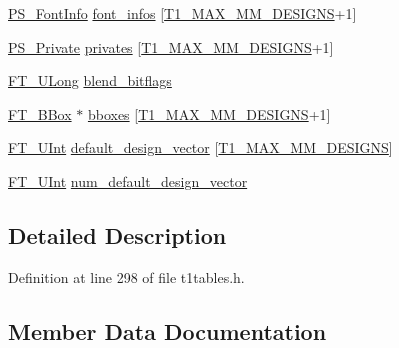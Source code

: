 \begin{DoxyCompactItemize}
\item 
\mbox{\hyperlink{t1tables_8h_a413d5f096543f289c85f416f688ffc06}{P\+S\+\_\+\+Font\+Info}} \mbox{\hyperlink{struct_p_s___blend_rec___ac5478cafc838257e693a9604edf1f5e9}{font\+\_\+infos}} \mbox{[}\mbox{\hyperlink{t1tables_8h_a933ca229674aa312fd5546fadc95e08f}{T1\+\_\+\+M\+A\+X\+\_\+\+M\+M\+\_\+\+D\+E\+S\+I\+G\+NS}}+1\mbox{]}
\item 
\mbox{\hyperlink{t1tables_8h_af13eae0f58324d685b24cd4079c01c7e}{P\+S\+\_\+\+Private}} \mbox{\hyperlink{struct_p_s___blend_rec___a2b6e0c48d7a9c350b09f2943c1779ea4}{privates}} \mbox{[}\mbox{\hyperlink{t1tables_8h_a933ca229674aa312fd5546fadc95e08f}{T1\+\_\+\+M\+A\+X\+\_\+\+M\+M\+\_\+\+D\+E\+S\+I\+G\+NS}}+1\mbox{]}
\item 
\mbox{\hyperlink{fttypes_8h_a4fac88bdba78eb76b505efa6e4fbf3f5}{F\+T\+\_\+\+U\+Long}} \mbox{\hyperlink{struct_p_s___blend_rec___a86caa5319e208b4a2057db656bad9221}{blend\+\_\+bitflags}}
\item 
\mbox{\hyperlink{ftimage_8h_ae341c4eb5a7199947a13b2a1dcaf7af7}{F\+T\+\_\+\+B\+Box}} $\ast$ \mbox{\hyperlink{struct_p_s___blend_rec___a30845d3cbd2e95a5f9cc867c7226af5e}{bboxes}} \mbox{[}\mbox{\hyperlink{t1tables_8h_a933ca229674aa312fd5546fadc95e08f}{T1\+\_\+\+M\+A\+X\+\_\+\+M\+M\+\_\+\+D\+E\+S\+I\+G\+NS}}+1\mbox{]}
\item 
\mbox{\hyperlink{fttypes_8h_abcb8db4dbf35d2b55a9e8c7b0926dc52}{F\+T\+\_\+\+U\+Int}} \mbox{\hyperlink{struct_p_s___blend_rec___a3ddacbda91fe0f9ef934a9e0afa6286f}{default\+\_\+design\+\_\+vector}} \mbox{[}\mbox{\hyperlink{t1tables_8h_a933ca229674aa312fd5546fadc95e08f}{T1\+\_\+\+M\+A\+X\+\_\+\+M\+M\+\_\+\+D\+E\+S\+I\+G\+NS}}\mbox{]}
\item 
\mbox{\hyperlink{fttypes_8h_abcb8db4dbf35d2b55a9e8c7b0926dc52}{F\+T\+\_\+\+U\+Int}} \mbox{\hyperlink{struct_p_s___blend_rec___afa5c7dd4206eb8a1d9ef4894abfc9555}{num\+\_\+default\+\_\+design\+\_\+vector}}
\end{DoxyCompactItemize}


\subsection{Detailed Description}


Definition at line 298 of file t1tables.\+h.



\subsection{Member Data Documentation}
\mbox{\label{struct_p_s___blend_rec___afc0e4018ff3439f306d61e3c219b91f9}} 
